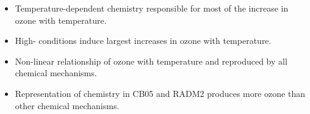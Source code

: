 \begin{BlueBox}
    \vskip-1cm
    \begin{block}{}
        \vspace{9mm}
        \begin{itemize}
            \item Temperature-dependent chemistry responsible for most of the increase in ozone with temperature. \vspace{20mm}
            \item High- conditions induce largest increases in ozone with temperature. \vspace{20mm}
            \item Non-linear relationship of ozone with temperature and  reproduced by all chemical mechanisms. \vspace{20mm}
            \item Representation of chemistry in CB05 and RADM2 produces more ozone than other chemical mechanisms. \vspace{20mm}
        \end{itemize}        
    \end{block}
\end{BlueBox}
